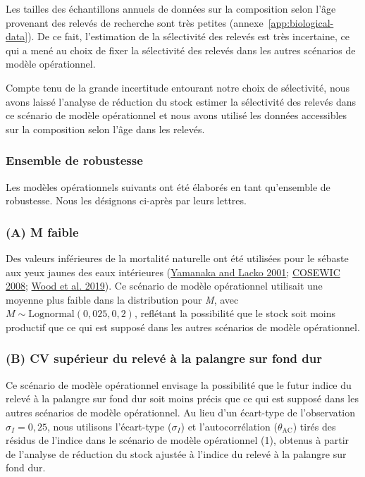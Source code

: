 \documentclass[11pt]{book}
\begin{document}
Les tailles des échantillons annuels de données sur la composition selon l'âge provenant des relevés de recherche sont très petites (annexe~\ref{app:biological-data}). De ce fait, l'estimation de la sélectivité des relevés est très incertaine, ce qui a mené au choix de fixer la sélectivité des relevés dans les autres scénarios de modèle opérationnel.

Compte tenu de la grande incertitude entourant notre choix de sélectivité, nous avons laissé l'analyse de réduction du stock estimer la sélectivité des relevés dans ce scénario de modèle opérationnel et nous avons utilisé les données accessibles sur la composition selon l'âge dans les relevés.

\hypertarget{sec:approach3-robustness}{%
\subsubsection{Ensemble de robustesse}\label{sec:approach3-robustness}}

Les modèles opérationnels suivants ont été élaborés en tant qu'ensemble de robustesse. Nous les désignons ci-après par leurs lettres.

\hypertarget{sec:approach3-referenceA}{%
\subsubsection{(A) M faible}\label{sec:approach3-referenceA}}

Des valeurs inférieures de la mortalité naturelle ont été utilisées pour le sébaste aux yeux jaunes des eaux intérieures (\protect\hyperlink{ref-yamanaka2001}{Yamanaka and Lacko 2001}; \protect\hyperlink{ref-cosewic2008}{COSEWIC 2008}; \protect\hyperlink{ref-wood2019}{Wood et al. 2019}). Ce scénario de modèle opérationnel utilisait une moyenne plus faible dans la distribution pour \emph{M}, avec \(M \sim \textrm{Lognormal}(0,025, 0,2)\), reflétant la possibilité que le stock soit moins productif que ce qui est supposé dans les autres scénarios de modèle opérationnel.

\hypertarget{sec:approach3-referenceB}{%
\subsubsection{(B) CV supérieur du relevé à la palangre sur fond dur}\label{sec:approach3-referenceB}}

Ce scénario de modèle opérationnel envisage la possibilité que le futur indice du relevé à la palangre sur fond dur soit moins précis que ce qui est supposé dans les autres scénarios de modèle opérationnel. Au lieu d'un écart-type de l'observation \(\sigma_I = 0,25\), nous utilisons l'écart-type (\(\sigma_I\)) et l'autocorrélation (\(\theta_\textrm{AC}\)) tirés des résidus de l'indice dans le scénario de modèle opérationnel (1), obtenus à partir de l'analyse de réduction du stock ajustée à l'indice du relevé à la palangre sur fond dur.
\end{document}
